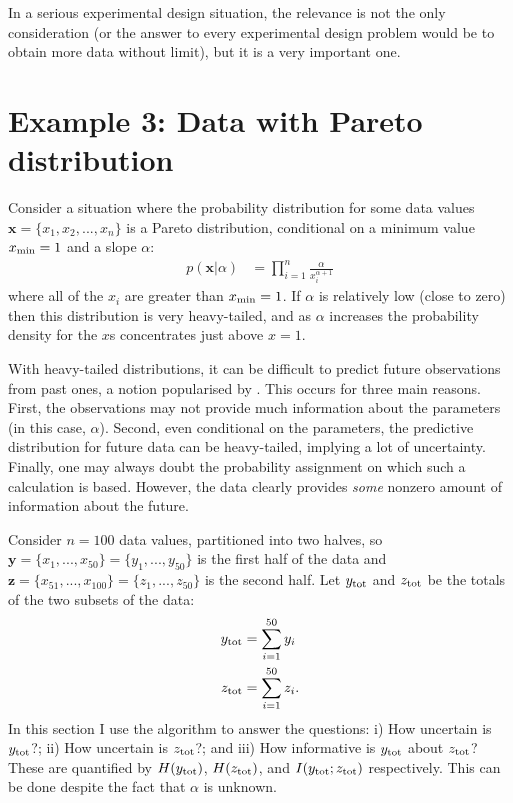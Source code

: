 \documentclass[entropy,article,accept,oneauthor,pdftex,10pt,a4paper]{mdpi}
\newcommand{\ytot}{y_{\rm tot}}
\newcommand{\ztot}{z_{\rm tot}}
\begin{document}
In a serious experimental design situation, the relevance is not the only
consideration (or the answer to every experimental design problem would
be to obtain more data without limit), but it is a very important one.

\section{Example 3: Data with Pareto distribution}

Consider a situation where the probability distribution for some data values
$\boldsymbol{x} = \{x_1, x_2, ..., x_n\}$ is a Pareto distribution, conditional on
a minimum value $x_{\rm min}=1$ and a slope $\alpha$:
\begin{align}
p(\boldsymbol{x} | \alpha) &= \prod_{i=1}^n \frac{\alpha}{x_i^{\alpha + 1}}
\end{align}
where all of the $x_i$ are greater than $x_{\rm min} = 1$.
If $\alpha$ is relatively low (close to zero) then this distribution is
very heavy-tailed, and as $\alpha$ increases the probability density
for the $x$s concentrates just above $x=1$.

With heavy-tailed distributions, it can be difficult to predict future
observations from past ones, a notion popularised by
\citet{taleb2007black}. This occurs for three main reasons.
First, the observations may not
provide much information about the parameters (in this case, $\alpha$).
Second, even conditional on the parameters, the predictive distribution for
future data can be heavy-tailed, implying a lot of uncertainty.
Finally, one may always doubt the probability assignment on which such a
calculation is based.
However, the data clearly provides {\em some} nonzero
amount of information about the future.

Consider $n=100$ data values, partitioned into two halves, so
$\boldsymbol{y} = \{x_1, ..., x_{50}\} = \{y_1, ..., y_{50}\}$
is the first half of the data and
$\boldsymbol{z} = \{x_{51}, ..., x_{100}\} = \{z_1, ..., z_{50}\}$
is the second half. Let $\ytot$ and $\ztot$ be the totals of the two
subsets of the data:
\begin{align}
\ytot &= \sum_{i=1}^{50} y_i \\
\ztot &= \sum_{i=1}^{50} z_i.
\end{align}
In this section I use the algorithm to answer the questions:
i) How uncertain is $\ytot$?; ii) How uncertain is $\ztot$?; and
iii) How informative is $\ytot$ about $\ztot$? These are quantified by
$H(\ytot)$, $H(\ztot)$, and $I(\ytot; \ztot)$ respectively. This can
be done despite the fact that $\alpha$ is unknown.
\end{document}
